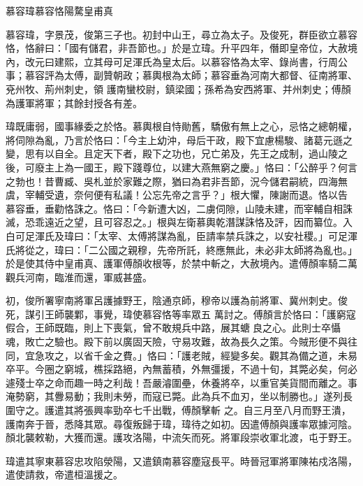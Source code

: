 
\begin{pinyinscope}

 慕容瑋慕容恪陽騖皇甫真



 慕容瑋，字景茂，俊第三子也。初封中山王，尋立為太子。及俊死，群臣欲立慕容恪，恪辭曰：「國有儲君，非吾節也。」於是立瑋。升平四年，僭即皇帝位，大赦境內，改元曰建熙，立其母可足渾氏為皇太后。以慕容恪為太宰、錄尚書，行周公事；慕容評為太傅，副贊朝政；慕輿根為太師；慕容垂為河南大都督、征南將軍、兗州牧、荊州刺史，領
 護南蠻校尉，鎮梁國；孫希為安西將軍、并州刺史；傅顏為護軍將軍；其餘封授各有差。



 瑋既庸弱，國事緣委之於恪。慕輿根自恃勛舊，驕傲有無上之心，忌恪之總朝權，將伺隙為亂，乃言於恪曰：「今主上幼沖，母后干政，殿下宜慮楊駿、諸葛元遜之變，思有以自全。且定天下者，殿下之功也，兄亡弟及，先王之成制，過山陵之後，可廢主上為一國王，殿下踐尊位，以建大燕無窮之慶。」恪曰：「公醉乎？何言之勃也！昔曹臧、吳札並於家難之際，猶曰為君非吾節，況今儲君嗣統，四海無虞，宰輔受遺，奈何便有私議！公忘先帝之言乎？」根大懼，陳謝而退。恪以告
 慕容垂，垂勸恪誅之。恪曰：「今新遭大凶，二虜伺隙，山陵未建，而宰輔自相誅滅，恐乖遠近之望，且可容忍之。」根與左衛慕輿乾潛謀誅恪及評，因而纂位。入白可足渾氏及瑋曰：「太宰、太傅將謀為亂，臣請率禁兵誅之，以安社稷。」可足渾氏將從之，瑋曰：「二公國之親穆，先帝所託，終應無此，未必非太師將為亂也。」於是使其侍中皇甫真、護軍傅顏收根等，於禁中斬之，大赦境內。遣傅顏率騎二萬觀兵河南，臨淮而還，軍威甚盛。



 初，俊所署寧南將軍呂護據野王，陰通京師，穆帝以護為前將軍、冀州刺史。俊死，謀引王師襲鄴，事覺，瑋使慕容恪等率眾五
 萬討之。傅顏言於恪曰：「護窮寇假合，王師既臨，則上下喪氣，曾不敢規兵中路，展其螗良之心。此則士卒懾魂，敗亡之驗也。殿下前以廣固天險，守易攻難，故為長久之策。今賊形便不與往同，宜急攻之，以省千金之費。」恪曰：「護老賊，經變多矣。觀其為備之道，未易卒平。今圈之窮城，樵採路絕，內無蓄積，外無彊援，不過十旬，其斃必矣，何必遽殘士卒之命而趣一時之利哉！吾嚴濬圍壘，休養將卒，以重官美貨間而離之。事淹勢窮，其釁易動；我則未勞，而寇已斃。此為兵不血刃，坐以制勝也。」遂列長圍守之。護遣其將張興率勁卒七千出戰，傅顏擊斬
 之。自三月至八月而野王潰，護南奔于晉，悉降其眾。尋復叛歸于瑋，瑋待之如初。因遣傅顏與護率眾據河陰。顏北襲敕勒，大獲而還。護攻洛陽，中流矢而死。將軍段崇收軍北渡，屯于野王。



 瑋遣其寧東慕容忠攻陷滎陽，又遣鎮南慕容塵寇長平。時晉冠軍將軍陳祐戍洛陽，遣使請救，帝遣桓溫援之。




\end{pinyinscope}
